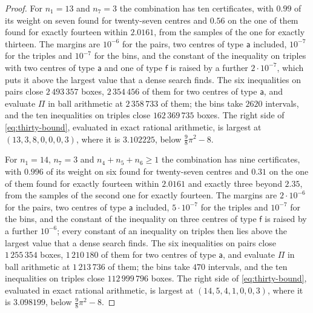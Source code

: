 \documentclass[11pt,reqno]{amsart}
\renewcommand{\_}{\origunderscore\allowbreak}
\numberwithin{equation}{section}
\theoremstyle{plain}
\theoremstyle{definition}
\theoremstyle{remark}
\begin{document}
\begin{proof}
For $n_1=13$ and $n_7=3$ the combination has ten certificates, with $0.99$
of its weight on seven found for twenty-seven centres and $0.56$ on the one
of them found for exactly fourteen within $2.0161$, from the samples of the
one for exactly thirteen. The margins are $10^{-6}$ for the pairs, two
centres of type $\mathsf a$ included, $10^{-7}$ for the triples and
$10^{-7}$ for the bins, and the constant of the inequality on triples with
two centres of type $\mathsf a$ and one of type $\mathsf f$ is raised by a
further $2\cdot10^{-7}$, which puts it above the largest value that a dense search
finds. The six inequalities on pairs close $2\,493\,357$ boxes, $2\,354\,456$ of them for two
centres of type $\mathsf a$, and evaluate $\Pi$ in ball arithmetic at $2\,358\,733$
of them; the bins take $2620$ intervals, and the ten inequalities on triples
close $162\,369\,735$ boxes. The right side of \eqref{eq:thirty-bound}, evaluated in
exact rational arithmetic, is largest at $(13,3,8,0,0,0,3)$, where it is $3.102225$, below
$\frac98\pi^2-8$.

For $n_1=14$, $n_7=3$ and $n_4+n_5+n_6\ge1$ the combination has nine
certificates, with $0.996$ of its weight on six found for twenty-seven
centres and $0.31$ on the one of them found for exactly fourteen within
$2.0161$ and exactly three beyond $2.35$, from the samples of the second
one for exactly fourteen. The margins are $2\cdot10^{-6}$ for the pairs,
two centres of type $\mathsf a$ included, $5\cdot10^{-7}$ for the triples
and $10^{-7}$ for the bins, and the constant of the inequality on three
centres of type $\mathsf f$ is raised by a further $10^{-6}$; every
constant of an inequality on triples then lies above the largest value that
a dense search finds. The six inequalities on pairs close $1\,255\,354$
boxes, $1\,210\,180$ of them for two centres of type $\mathsf a$, and
evaluate $\Pi$ in ball arithmetic at $1\,213\,736$ of them; the bins take
$470$ intervals, and the ten inequalities on triples close
$112\,999\,796$ boxes. The right side of \eqref{eq:thirty-bound},
evaluated in exact rational arithmetic, is largest at $(14,5,4,1,0,0,3)$,
where it is $3.098199$, below $\frac98\pi^2-8$.


\end{proof}
\end{document}
